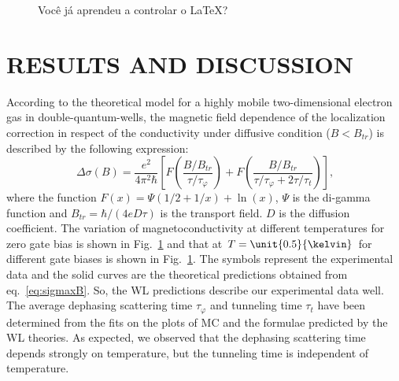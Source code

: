 \documentclass[prb,showpacs,showkeys,twocolumn]{revtex4}
\newcommand{\ttau}   {\ensuremath{\tau_t}}
\newcommand{\tauphi} {\ensuremath{\tau_\varphi}}
\begin{document}
	\begin{figure}
		\centering
		\caption{Você já aprendeu a controlar o \LaTeX?}
		\label{fig:knuth}
	\end{figure}	

\section{RESULTS AND DISCUSSION}\label{sec:results}

	According to the theoretical model for a highly mobile two-dimensional electron gas in double-quantum-wells, the magnetic field dependence of the localization correction in respect of the conductivity under diffusive condition ($B < B_{tr}$) is described by the following expression:
	\begin{equation}\label{eq:sigmaxB}
		\Delta\sigma(B) = \frac{e^2}{4\pi^2\hbar} \left[
		F\left(\frac{B/B_{tr}}{\tau/\tauphi}\right) +
		F\left(\frac{B/B_{tr}}{\tau/\tauphi + 2\tau/\ttau}\right) \right]\text{,}
	\end{equation}
	where the function $F(x) = \Psi(1/2 + 1/x) + \ln(x)$, $\Psi$ is the di-gamma function and $B_{tr} = \hbar/\left(4eD\tau\right)$ is the transport field.	$D$ is the diffusion coefficient. The variation of magnetoconductivity at	different temperatures for zero gate bias is shown in Fig.~\ref{fig:knuth} and that at $T = \unit{0.5}{\kelvin}$ for different gate biases is shown in Fig.~\ref{fig:knuth}. The symbols represent the experimental data and the solid curves are the theoretical predictions obtained from eq.~\eqref{eq:sigmaxB}. So, the WL predictions describe our experimental data well. The average dephasing scattering time $\tauphi$ and tunneling time $\ttau$ have been determined from the fits on the plots of MC and the formulae predicted by the WL theories. As expected, we observed that the dephasing scattering time depends strongly on temperature, but the tunneling time is independent of temperature.
		
\end{document}
